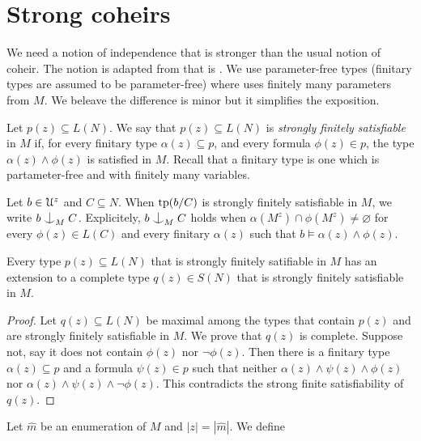 \section{Strong coheirs}

We need a notion of independence that is stronger than the usual notion of coheir.
The notion is adapted from that is \cite{KNP}.
We use parameter-free types (finitary types are assumed to be parameter-free) where \cite{KNP} uses finitely many parameters from $M$.
We beleave the difference is minor but it simplifies the exposition.

Let $p(z)\subseteq L(N)$.
We say that $p(z)\subseteq L(N)$ is \emph{strongly finitely satisfiable\/} in $M$ if, for every finitary type $\alpha(z)\subseteq p$, and every formula $\phi(z)\in p$, the type $\alpha(z)\wedge\phi(z)$ is satisfied in $M$.
Recall that a finitary type is one which is partameter-free and with finitely many variables.

Let $b\in\EuScript U^z$ and $C\subseteq N$.
When ${\rm tp}(b/C)$ is strongly finitely satisfiable in $M$, we write \emph{$b\nonfork_M C$.}
Explicitely, $b\nonfork_M C$ holds when $\alpha(M^z)\cap\phi(M^z)\neq\varnothing$ for every $\phi(z)\in L(C)$ and every finitary $\alpha(z)$ such that $b\models\alpha(z)\wedge\phi(z)$.

\begin{fact}
  Every type $p(z)\subseteq L(N)$ that is strongly finitely satifiable in $M$ has an extension to a complete type $q(z)\in S(N)$ that is strongly finitely satisfiable in $M$.
\end{fact}

\begin{proof}
  Let $q(z)\subseteq L(N)$ be maximal among the types that contain $p(z)$ and are strongly finitely satisfiable in $M$.
  We prove that $q(z)$ is complete.
  Suppose not, say it does not contain $\phi(z)$ nor $\neg\phi(z)$.
  Then there is a finitary type $\alpha(z)\subseteq p$ and a formula $\psi(z)\in p$ such that neither $\alpha(z)\wedge\psi(z)\wedge\phi(z)$ nor $\alpha(z)\wedge\psi(z)\wedge\neg\phi(z)$.
  This contradicts the strong finite satisfiability of $q(z)$.
\end{proof}

Let $\hat m$ be an enumeration of $M$ and $|z|=|\hat m|$.
We define


